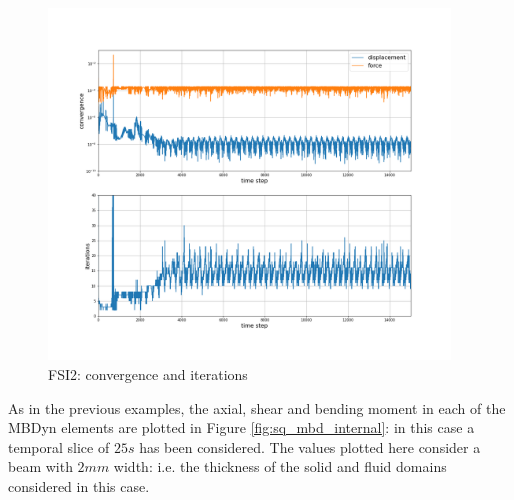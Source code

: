 \begin{figure}[htbp!]
	\centering
	\includegraphics[width=0.95\textwidth, trim=0 80 0 100, clip]{images/FSI2/MBD_iterations_fsi2.png}
	\caption{FSI2: convergence and iterations}
	\label{fig:FSI2_mbd_iter}
\end{figure}

As in the previous examples, the axial, shear and bending moment in each of the MBDyn elements are plotted in Figure \ref{fig:sq_mbd_internal}: in this case a temporal slice of $25s$ has been considered. The values plotted here consider a beam with $2mm$ width: i.e. the thickness of the solid and fluid domains considered in this case.

